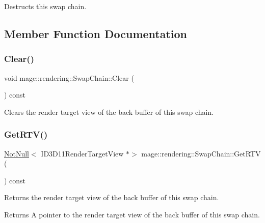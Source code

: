 Destructs this swap chain. 

\subsection{Member Function Documentation}
\hypertarget{classmage_1_1rendering_1_1_swap_chain_ab834da2afc837fe4c113f86c300af264}{}\label{classmage_1_1rendering_1_1_swap_chain_ab834da2afc837fe4c113f86c300af264} 
\subsubsection{\texorpdfstring{Clear()}{Clear()}}
{\footnotesize\ttfamily void mage\+::rendering\+::\+Swap\+Chain\+::\+Clear (\begin{DoxyParamCaption}{ }\end{DoxyParamCaption}) const\hspace{0.3cm}{\ttfamily [noexcept]}}

Clears the render target view of the back buffer of this swap chain. \hypertarget{classmage_1_1rendering_1_1_swap_chain_afa9c115a04dac008228c668169dd8bd5}{}\label{classmage_1_1rendering_1_1_swap_chain_afa9c115a04dac008228c668169dd8bd5} 
\subsubsection{\texorpdfstring{Get\+R\+T\+V()}{GetRTV()}}
{\footnotesize\ttfamily \hyperlink{namespacemage_a8769f9d670d6b585ea306cb1062af94b}{Not\+Null}$<$ I\+D3\+D11\+Render\+Target\+View $\ast$$>$ mage\+::rendering\+::\+Swap\+Chain\+::\+Get\+R\+TV (\begin{DoxyParamCaption}{ }\end{DoxyParamCaption}) const\hspace{0.3cm}{\ttfamily [noexcept]}}

Returns the render target view of the back buffer of this swap chain.

\begin{DoxyReturn}{Returns}
A pointer to the render target view of the back buffer of this swap chain. 
\end{DoxyReturn}
\hypertarget{classmage_1_1rendering_1_1_swap_chain_ab140a96957564646ec81eabaa6ea7522}{}\label{classmage_1_1rendering_1_1_swap_chain_ab140a96957564646ec81eabaa6ea7522} 
